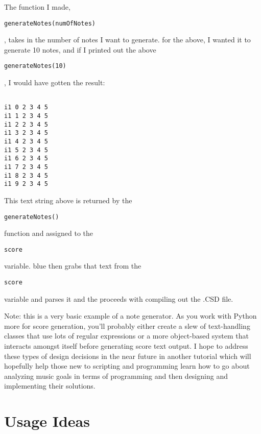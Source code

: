 The function I made,

\begin{verbatim}
generateNotes(numOfNotes)
\end{verbatim}

, takes in the number of notes I want to generate. for the above, I
wanted it to generate 10 notes, and if I printed out the above

\begin{verbatim}
generateNotes(10)
\end{verbatim}

, I would have gotten the result:

\begin{verbatim}
 
i1 0 2 3 4 5 
i1 1 2 3 4 5
i1 2 2 3 4 5
i1 3 2 3 4 5
i1 4 2 3 4 5
i1 5 2 3 4 5
i1 6 2 3 4 5
i1 7 2 3 4 5
i1 8 2 3 4 5
i1 9 2 3 4 5
\end{verbatim}

This text string above is returned by the

\begin{verbatim}
generateNotes()
\end{verbatim}

function and assigned to the

\begin{verbatim}
score
\end{verbatim}

variable. blue then grabs that text from the

\begin{verbatim}
score
\end{verbatim}

variable and parses it and the proceeds with compiling out the .CSD
file.

Note: this is a very basic example of a note generator. As you work with
Python more for score generation, you'll probably either create a slew
of text-handling classes that use lots of regular expressions or a more
object-based system that interacts amongst itself before generating
score text output. I hope to address these types of design decisions in
the near future in another tutorial which will hopefully help those new
to scripting and programming learn how to go about analyzing music goals
in terms of programming and then designing and implementing their
solutions.

\section{Usage Ideas}

